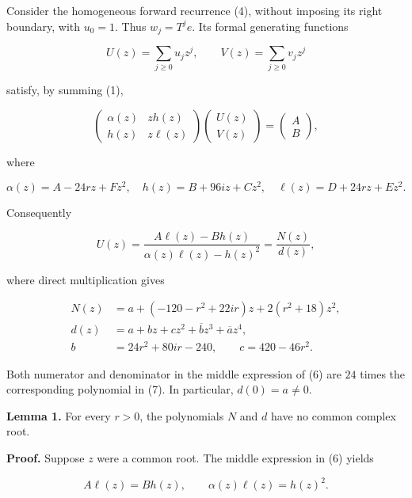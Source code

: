 \documentclass[10pt,a4paper]{article}
\begin{document}
Consider the homogeneous forward recurrence (4), without imposing its
right boundary, with \(u_0=1\). Thus \(w_j=T^je\). Its formal generating
functions

\nopagebreak[4]

\[
U(z)=\sum_{j\ge0}u_jz^j,\qquad V(z)=\sum_{j\ge0}v_jz^j
\]

satisfy, by summing (1),

\nopagebreak[4]

\[
\begin{pmatrix}\alpha(z)&z h(z)\\h(z)&z\ell(z)\end{pmatrix}
\begin{pmatrix}U(z)\\V(z)\end{pmatrix}
=\begin{pmatrix}A\\B\end{pmatrix},
\tag{5}
\]

where

\nopagebreak[4]

\[
\alpha(z)=A-24rz+Fz^2,\quad
h(z)=B+96iz+Cz^2,\quad
\ell(z)=D+24rz+Ez^2.
\]

Consequently

\nopagebreak[4]

\[
U(z)=\frac{A\ell(z)-Bh(z)}{\alpha(z)\ell(z)-h(z)^2}
     =\frac{N(z)}{d(z)},
\tag{6}
\]

where direct multiplication gives

\nopagebreak[4]

\[
\begin{aligned}
N(z)&=a+(-120-r^2+22ir)z+2(r^2+18)z^2,\\
d(z)&=a+bz+cz^2+\overline b z^3+\overline a z^4,\\
b&=24r^2+80ir-240,\qquad c=420-46r^2.
\end{aligned}
\tag{7}
\]

Both numerator and denominator in the middle expression of (6) are
\(24\) times the corresponding polynomial in (7). In particular,
\(d(0)=a\ne0\).

\textbf{Lemma 1.} For every \(r>0\), the polynomials \(N\) and \(d\)
have no common complex root.

\textbf{Proof.} Suppose \(z\) were a common root. The middle expression
in (6) yields

\nopagebreak[4]

\[
A\ell(z)=Bh(z),\qquad
\alpha(z)\ell(z)=h(z)^2.
\]
\end{document}
